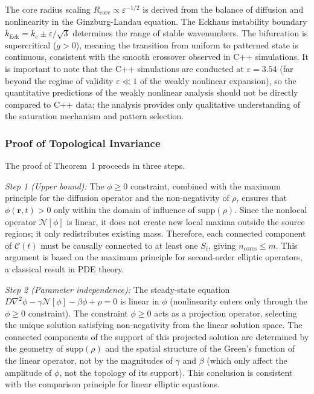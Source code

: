 \documentclass[sn-nature,pdflatex]{sn-jnl}
\begin{document}
The core radius scaling $R_{\text{core}} \propto \varepsilon^{-1/2}$ is derived from the balance of diffusion and nonlinearity in the Ginzburg-Landau equation. The Eckhaus instability boundary $k_{\text{Eck}} = k_c \pm \varepsilon/\sqrt{3}$ determines the range of stable wavenumbers. The bifurcation is supercritical ($g > 0$), meaning the transition from uniform to patterned state is continuous, consistent with the smooth crossover observed in C++ simulations. It is important to note that the C++ simulations are conducted at $\varepsilon = 3.54$ (far beyond the regime of validity $\varepsilon \ll 1$ of the weakly nonlinear expansion), so the quantitative predictions of the weakly nonlinear analysis should not be directly compared to C++ data; the analysis provides only qualitative understanding of the saturation mechanism and pattern selection.

\subsubsection{Proof of Topological Invariance}
\label{sec:proof_topological}

The proof of Theorem~1 proceeds in three steps.

\noindent\textit{Step 1 (Upper bound):} The $\phi \ge 0$ constraint, combined with the maximum principle for the diffusion operator and the non-negativity of $\rho$, ensures that $\phi(\mathbf{r}, t) > 0$ only within the domain of influence of $\text{supp}(\rho)$. Since the nonlocal operator $\mathcal{N}[\phi]$ is linear, it does not create new local maxima outside the source regions; it only redistributes existing mass. Therefore, each connected component of $\mathcal{C}(t)$ must be causally connected to at least one $S_i$, giving $n_{\text{cores}} \le m$. This argument is based on the maximum principle for second-order elliptic operators, a classical result in PDE theory.

\noindent\textit{Step 2 (Parameter independence):} The steady-state equation $D\nabla^2\phi - \gamma\mathcal{N}[\phi] - \beta\phi + \rho = 0$ is linear in $\phi$ (nonlinearity enters only through the $\phi \ge 0$ constraint). The constraint $\phi \ge 0$ acts as a projection operator, selecting the unique solution satisfying non-negativity from the linear solution space. The connected components of the support of this projected solution are determined by the geometry of $\text{supp}(\rho)$ and the spatial structure of the Green's function of the linear operator, not by the magnitudes of $\gamma$ and $\beta$ (which only affect the amplitude of $\phi$, not the topology of its support). This conclusion is consistent with the comparison principle for linear elliptic equations.
\end{document}
